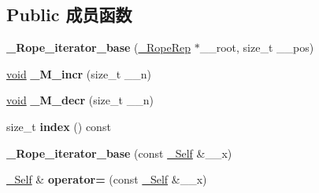 \subsection*{Public 成员函数}
\begin{DoxyCompactItemize}
\item 
\mbox{\label{class___rope__iterator__base_af928f71cedd3b7d69e56674fe79a8a79}} 
{\bfseries \+\_\+\+Rope\+\_\+iterator\+\_\+base} (\hyperlink{struct___rope___rope_rep}{\+\_\+\+Rope\+Rep} $\ast$\+\_\+\+\_\+root, size\+\_\+t \+\_\+\+\_\+pos)
\item 
\mbox{\label{class___rope__iterator__base_a2313bc0d7c033f8eeff19b28a2f10282}} 
\hyperlink{interfacevoid}{void} {\bfseries \+\_\+\+M\+\_\+incr} (size\+\_\+t \+\_\+\+\_\+n)
\item 
\mbox{\label{class___rope__iterator__base_a252f6bc70c48e8f4fbafe5a1b547f348}} 
\hyperlink{interfacevoid}{void} {\bfseries \+\_\+\+M\+\_\+decr} (size\+\_\+t \+\_\+\+\_\+n)
\item 
\mbox{\label{class___rope__iterator__base_a89f20ceca8b30a52d9d6de31a7cfb461}} 
size\+\_\+t {\bfseries index} () const
\item 
\mbox{\label{class___rope__iterator__base_a4fa773b5fcf49c3d0b3e3e5ad95bbc5a}} 
{\bfseries \+\_\+\+Rope\+\_\+iterator\+\_\+base} (const \hyperlink{class___rope__iterator__base}{\+\_\+\+Self} \&\+\_\+\+\_\+x)
\item 
\mbox{\label{class___rope__iterator__base_a60f012d8493877ff4e457ea8e7bb5eed}} 
\hyperlink{class___rope__iterator__base}{\+\_\+\+Self} \& {\bfseries operator=} (const \hyperlink{class___rope__iterator__base}{\+\_\+\+Self} \&\+\_\+\+\_\+x)
\end{DoxyCompactItemize}
